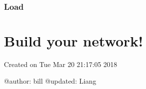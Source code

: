 \documentclass[letterpaper,10pt,english]{sphinxmanual}
\begin{document}
\subsection{Load}
\label{\detokenize{usage/data:load}}

\chapter{Build your network!}
\label{\detokenize{usage/quickstart:module-unet}}\label{\detokenize{usage/quickstart:build-your-network}}\label{\detokenize{usage/quickstart::doc}}
Created on Tue Mar 20 21:17:05 2018

@author: bill
@updated: Liang
\end{document}
